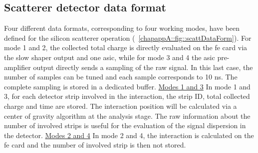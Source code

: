 
\subsection{Scatterer detector data format}\label{chapappA::subsec::scattDataFormat}
Four different data formats, corresponding to four working modes, have been defined for the silicon scatterer operation (\figurename~\ref{chapappA::fig::scattDataForm}). For mode 1 and 2, the collected total charge is directly evaluated on the \gls{fe} card via the slow shaper output and one \gls{asic}, while for mode 3 and 4 the \gls{asic} pre-amplifier output directly sends a sampling of the raw signal.  In this last case, the number of samples can be tuned and each sample corresponds to 10 ns. The complete sampling is stored in a dedicated buffer.\newline\newline
\underline{Modes 1 and 3}\newline
In mode 1 and 3, for each detector strip involved in the interaction, the strip ID, total collected charge and time are stored. The interaction position will be calculated via a center of gravity algorithm at the analysis stage. The raw information about the number of involved strips is useful for the evaluation of the signal dispersion in the detector.\newline
\underline{Modes 2 and 4}\newline
In mode 2 and 4, the interaction is calculated on the \gls{fe} card and the number of involved strip is then not stored.\newline

